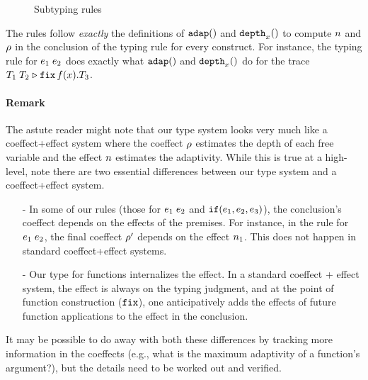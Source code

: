 \documentclass[a4paper,11pt]{article}
\theoremstyle{definition}
\begin{document}
\begin{figure}
 \caption{Subtyping rules}
  \label{fig:sub-type-rules}
\end{figure}


The rules follow \emph{exactly} the definitions of $\mathtt{adap}()$ and
$\mathtt{depth}_{x}()$ to compute $n$ and $\rho$ in the conclusion of the
typing rule for every construct. For instance, the typing rule for
$e_1 \; e_2$ does exactly what $\mathtt{adap}()$ and $\mathtt{depth}_{x}()$
do for the trace $T_1 \; T_2 \mathrel{\triangleright} {\mathop{\mathtt{fix}} f(x).T_3}$.

\paragraph{Remark}
The astute reader might note that our type system looks very much like
a coeffect+effect system where the coeffect $\rho$ estimates the
depth of each free variable and the effect $n$ estimates the
adaptivity. While this is true at a high-level, note there are two
essential differences between our type system and a coeffect+effect
system.
\begin{itemize}
\item[-] In some of our rules (those for $e_1 \; e_2$ and
  $\mathtt{if}(e_1, e_2, e_3)$), the conclusion's coeffect
  depends on the effects of the premises. For instance, in the rule
  for $e_1 \; e_2$, the final coeffect $\rho'$ depends on
  the effect $n_1$. This does not happen in standard
  coeffect+effect systems.
\item[-] Our type for functions internalizes the effect. In a standard
  coeffect + effect system, the effect is always on the typing
  judgment, and at the point of function construction ($\mathop{\mathtt{fix}}$), one
  anticipatively adds the effects of future function applications to
  the effect in the conclusion.
\end{itemize}
It may be possible to do away with both these differences by tracking
more information in the coeffects (e.g., what is the maximum
adaptivity of a function's argument?), but the details need to be
worked out and verified.
\end{document}
